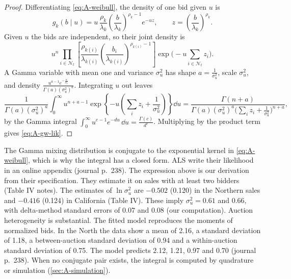 \begin{proof}
Differentiating \eqref{eq:A-weibull}, the density of one bid given $u$ is
\begin{equation*}
  g_k(b \mid u) = u\,\frac{\rho_k}{\lambda_k}\left(\frac{b}{\lambda_k}\right)^{\rho_k - 1}e^{-uz}, \qquad
  z = \left(\frac{b}{\lambda_k}\right)^{\rho_k}.
\end{equation*}
Given $u$ the bids are independent, so their joint density is
\begin{equation*}
  u^{n}\prod_{i \in \mathcal{N}_t}\left[\frac{\rho_{k(i)}}{\lambda_{k(i)}}\left(\frac{b_i}{\lambda_{k(i)}}\right)^{\rho_{k(i)} -
  1}\right]\exp\Big(-u\sum_{i \in \mathcal{N}_t}z_i\Big).
\end{equation*}
A Gamma variable with mean one and variance $\sigma_u^2$ has shape $a = \frac{1}{\sigma_u^2}$, scale
$\sigma_u^2$, and density $\frac{u^{a-1}e^{-\frac{u}{\sigma_u^2}}}{\Gamma(a)(\sigma_u^2)^a}$. Integrating $u$ out leaves
\begin{equation*}
  \frac{1}{\Gamma(a)(\sigma_u^2)^a}\int_0^\infty u^{n + a - 1}
  \exp\left\{-u\left(\sum_iz_i + \frac{1}{\sigma_u^2}\right)\right\}\dd u
  = \frac{\Gamma(n + a)}{\Gamma(a)(\sigma_u^2)^a\big(\sum_iz_i + \frac{1}{\sigma_u^2}\big)^{n + a}},
\end{equation*}
by the Gamma integral $\int_0^\infty u^{c-1}e^{-du}\,\dd u = \frac{\Gamma(c)}{d^c}$. Multiplying by the product term gives
\eqref{eq:A-gw-lik}.
\end{proof}

The Gamma mixing distribution is conjugate to the exponential kernel in \eqref{eq:A-weibull}, which is why the integral has a
closed form. ALS write their likelihood in an online appendix (journal p.~238). The expression above is our derivation
from their specification. They estimate it on sales with at least two bidders (Table IV notes). The estimates of
$\ln\sigma_u^2$ are $-0.502$ (0.120) in the Northern sales and $-0.416$ (0.124) in California (Table IV). These imply
$\sigma_u^2 = 0.61$ and $0.66$, with delta-method standard errors of 0.07 and 0.08 (our computation). Auction
heterogeneity is substantial. The fitted model reproduces the moments of normalized bids. In the North the data show a
mean of 2.16, a standard deviation of 1.18, a between-auction standard deviation of 0.94 and a within-auction standard
deviation of 0.75. The model predicts 2.12, 1.21, 0.97 and 0.70 (journal p.~238). When no conjugate pair exists, the
integral is computed by quadrature or simulation (\cref{sec:A-simulation}).

